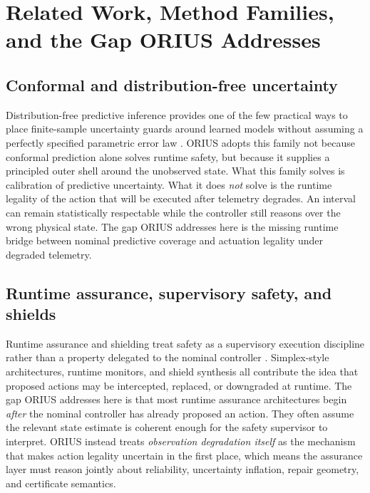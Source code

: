 \chapter{Related Work, Method Families, and the Gap ORIUS Addresses}
\label{ch:related-work-universal}
\section{{Conformal and distribution-free uncertainty}}
Distribution-free predictive inference provides one of the few practical ways to place
finite-sample uncertainty guards around learned models without assuming a perfectly
specified parametric error law \cite{vovk2005algorithmic,lei2018distribution,romano2019conformalized,gibbs2021adaptive,angelopoulos2023gentle,barber2023beyond,zaffran2022adaptive,stankeviciute2021conformal,xu2021dynamic,sesia2021comparison,bates2021distribution}.  ORIUS adopts this family not because
conformal prediction alone solves runtime safety, but because it supplies a principled
outer shell around the unobserved state.  What this family solves is calibration of
predictive uncertainty.  What it does \emph{not} solve is the runtime legality of the
action that will be executed after telemetry degrades.  An interval can remain
statistically respectable while the controller still reasons over the wrong physical
state.  The gap ORIUS addresses here is the missing runtime bridge between nominal
predictive coverage and actuation legality under degraded telemetry.

\section{{Runtime assurance, supervisory safety, and shields}}
Runtime assurance and shielding treat safety as a supervisory execution discipline rather
than a property delegated to the nominal controller \cite{sha2001using,sha1998simplex,desai2019soter,bloem2015shield,bartocci2018introduction,havelund2004runtime,leucker2009brief,schierman2015run,bak2011runtime}.  Simplex-style
architectures, runtime monitors, and shield synthesis all contribute the idea that
proposed actions may be intercepted, replaced, or downgraded at runtime.  The gap ORIUS
addresses here is that most runtime assurance architectures begin \emph{after} the
nominal controller has already proposed an action.  They often assume the relevant state
estimate is coherent enough for the safety supervisor to interpret.  ORIUS instead treats
\emph{observation degradation itself} as the mechanism that makes action legality
uncertain in the first place, which means the assurance layer must reason jointly about
reliability, uncertainty inflation, repair geometry, and certificate semantics.


